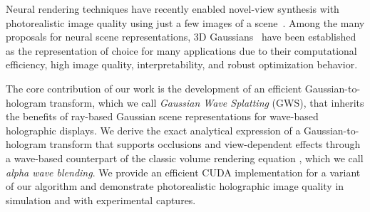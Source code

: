 Neural rendering techniques have recently enabled novel-view synthesis with photorealistic image quality using just a few images of a scene~\cite{tewari2020state,tewari2022advances}. Among the many proposals for neural scene representations, 3D Gaussians~\cite{kerbl3Dgaussians} have been established as the representation of choice for many applications due to their computational efficiency, high image quality, interpretability, and robust optimization behavior. 



The core contribution of our work is the development of an efficient Gaussian-to-hologram transform, which we call \textit{Gaussian Wave Splatting} (GWS), that inherits the benefits of ray-based Gaussian scene representations for wave-based holographic displays. We derive the exact analytical expression of a Gaussian-to-hologram transform that supports occlusions and view-dependent effects through a wave-based counterpart of the classic volume rendering equation \cite{kajiya1984ray}, which we call \textit{alpha wave blending}. We provide an efficient CUDA implementation for a variant of our algorithm and demonstrate photorealistic holographic image quality in simulation and with experimental captures.

